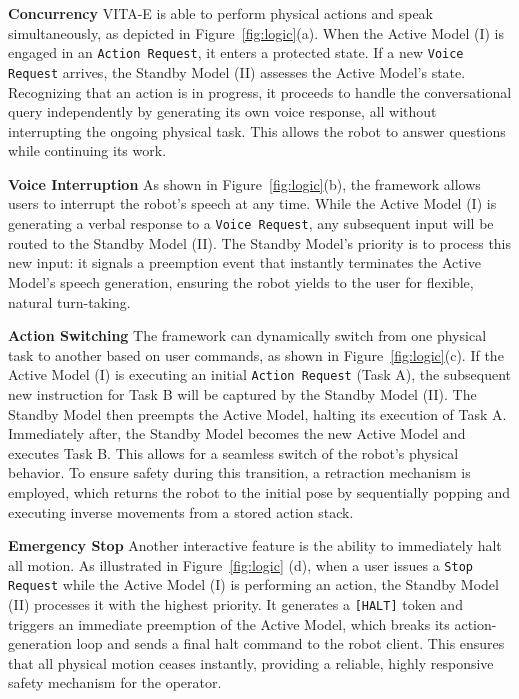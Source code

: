 \textbf{Concurrency}
VITA-E is able to perform physical actions and speak simultaneously, as depicted in Figure~\ref{fig:logic}(a). When the Active Model (I) is engaged in an \texttt{Action Request}, it enters a protected state. If a new \texttt{Voice Request} arrives, the Standby Model (II) assesses the Active Model's state. Recognizing that an action is in progress, it proceeds to handle the conversational query independently by generating its own voice response, all without interrupting the ongoing physical task. This allows the robot to answer questions while continuing its work.

\textbf{Voice Interruption}
As shown in Figure~\ref{fig:logic}(b), the framework allows users to interrupt the robot's speech at any time. While the Active Model (I) is generating a verbal response to a \texttt{Voice Request}, any subsequent input will be routed to the Standby Model (II). The Standby Model's priority is to process this new input: it signals a preemption event that instantly terminates the Active Model's speech generation, ensuring the robot yields to the user for flexible, natural turn-taking.

\textbf{Action Switching}
The framework can dynamically switch from one physical task to another based on user commands, as shown in Figure~\ref{fig:logic}(c). If the Active Model (I) is executing an initial \texttt{Action Request} (Task A), the subsequent new instruction for Task B will be captured by the Standby Model (II). The Standby Model then preempts the Active Model, halting its execution of Task A. Immediately after, the Standby Model becomes the new Active Model and executes Task B. This allows for a seamless switch of the robot's physical behavior. To ensure safety during this transition, a retraction mechanism is employed, which returns the robot to the initial pose by sequentially popping and executing inverse movements from a stored action stack.

\textbf{Emergency Stop}
Another interactive feature is the ability to immediately halt all motion. As illustrated in Figure~\ref{fig:logic} (d), when a user issues a \texttt{Stop Request} while the Active Model (I) is performing an action, the Standby Model (II) processes it with the highest priority. It generates a \texttt{[HALT]} token and triggers an immediate preemption of the Active Model, which breaks its action-generation loop and sends a final halt command to the robot client. This ensures that all physical motion ceases instantly, providing a reliable, highly responsive safety mechanism for the operator.
